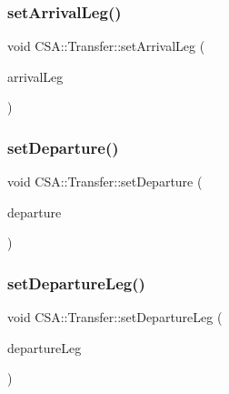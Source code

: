 \mbox{\label{classCSA_1_1Transfer_a3143da004508fa9c75e265054001e7bf}} 
\subsubsection{\texorpdfstring{set\+Arrival\+Leg()}{setArrivalLeg()}}
{\footnotesize\ttfamily void C\+S\+A\+::\+Transfer\+::set\+Arrival\+Leg (\begin{DoxyParamCaption}\item[{\mbox{\hyperlink{classCSA_1_1RouteLeg}{C\+S\+A\+::\+Route\+Leg}} $\ast$}]{arrival\+Leg }\end{DoxyParamCaption})}

\mbox{\label{classCSA_1_1Transfer_a284812274e48e89abae09e8ab37e5670}} 
\subsubsection{\texorpdfstring{set\+Departure()}{setDeparture()}}
{\footnotesize\ttfamily void C\+S\+A\+::\+Transfer\+::set\+Departure (\begin{DoxyParamCaption}\item[{\mbox{\hyperlink{classCSA_1_1RouteLegEnd}{C\+S\+A\+::\+Route\+Leg\+End}} $\ast$}]{departure }\end{DoxyParamCaption})}

\mbox{\label{classCSA_1_1Transfer_a70a78662a0ef74bb5d88b7796130f001}} 
\subsubsection{\texorpdfstring{set\+Departure\+Leg()}{setDepartureLeg()}}
{\footnotesize\ttfamily void C\+S\+A\+::\+Transfer\+::set\+Departure\+Leg (\begin{DoxyParamCaption}\item[{\mbox{\hyperlink{classCSA_1_1RouteLeg}{C\+S\+A\+::\+Route\+Leg}} $\ast$}]{departure\+Leg }\end{DoxyParamCaption})}

